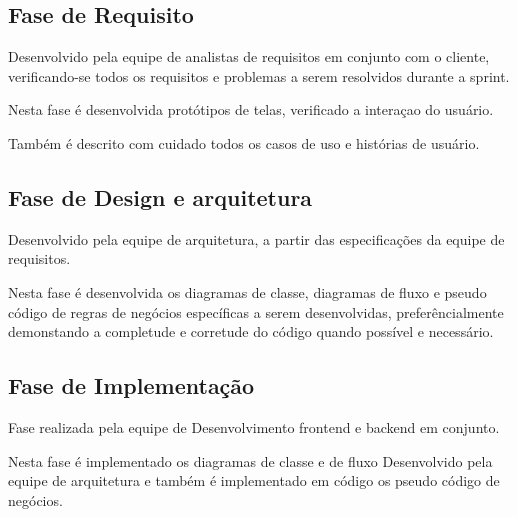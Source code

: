\subsection*{Fase de Requisito}

Desenvolvido pela equipe de analistas de requisitos em conjunto com o cliente, verificando-se todos os requisitos e problemas a serem resolvidos durante a sprint. 

Nesta fase é desenvolvida protótipos de telas, verificado a interaçao do usuário. 

Também é descrito com cuidado todos os casos de uso e histórias de usuário. 

\subsection*{Fase de Design e arquitetura}

Desenvolvido pela equipe de arquitetura, a partir das especificações da equipe de requisitos. 

Nesta fase é desenvolvida os diagramas de classe, diagramas de fluxo e pseudo código de regras de negócios específicas a serem desenvolvidas, preferêncialmente demonstando a completude e corretude do código quando possível e necessário. 


\subsection*{Fase de Implementação}

Fase realizada pela equipe de Desenvolvimento frontend e backend em conjunto.

Nesta fase é implementado os diagramas de classe e de fluxo Desenvolvido pela equipe de arquitetura e também é implementado em código os pseudo código de negócios.



